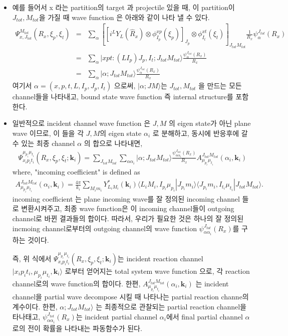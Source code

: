 \documentclass[11pt]{book}
\def\bm{\boldsymbol}
\def\vk{{\bm k}}
\def\la{\langle}
\def\ra{\rangle}
\newcommand{\bea}{\begin{eqnarray}}
\newcommand{\eea}{\end{eqnarray}}
\newcommand{\no}{\nonumber \\}
\begin{document}
\begin{itemize} 
\item 예를 들어서 x 라는 partition의 target 과 projectile 있을 때, 이 partition이 
$J_{tot},M_{tot}$을 가질 때 wave function 은  아래와 같이 
나타 낼 수 있다.
\bea 
\Psi_{x,J_{tot}}^{M_{tot}}(R_x,\xi_p,\xi_t)
&=&\sum_{\alpha} \left[ 
    \left[i^{L} Y_{L}(\hat{R}_x)\otimes \phi^{xp}_{I_p}(\xi_p)\right]_{J_p} 
    \otimes \phi^{xt}_{I_t}(\xi_t)\right]_{J_{tot}M_{tot}}
    \frac{1}{R_x}\psi_{\alpha}^{J_{tot}}(R_x) \no 
&=&\sum_{\alpha} |xpt:(L I_p) J_p,I_t;J_{tot} M_{tot}\ra 
    \frac{\psi_{\alpha}^{J_{tot}}(R_x) }{R_x} \no 
&=&\sum_{\alpha} |\alpha; J_{tot} M_{tot}\ra \frac{\psi_{\alpha}^{J_{tot}}(R_x) }{R_x}
\eea 
여기서 $\alpha=(x,p,t,L,I_p,J_p,I_t)$ 으로써, $|\alpha; J M\ra $는 $J_{tot},M_{tot}$ 을 
만드는 모든 channel들을 나타내고, bound state wave function 즉 internal structure를 포함한다. 

\item 일반적으로 incident channel wave function 은 $J,M$ 의 eigen state가 아닌 
plane wave 이므로, 이 들을 각 $J,M$의 eigen state $\alpha_i$ 로 분해하고, 동시에 
반응후에 갈 수 있는 최종 channel $\alpha$ 의 합으로 나타내면,
\bea 
\Psi_{x_ip_it_i}^{\mu_{p_i}\mu_{t_i}}(R_x,\xi_p,\xi_t; \vk_i)
=\sum_{J_{tot}M_{tot}}\sum_{\alpha \alpha_i}
  |\alpha;J_{tot}M_{tot}\ra 
   \frac{\psi^{J_{tot}}_{\alpha \alpha_i}(R_x)  }{R_x} 
   A^{J_{tot} M_{tot}}_{\mu_{p_i}\mu_{t_i}}(\alpha_i,\vk_i)
\eea  
where, "incoming coefficient" is defined as
\bea 
A^{J_{tot} M_{tot}}_{\mu_{p_i}\mu_{t_i}}(\alpha_i,\vk_i)
=\frac{4\pi}{k_i}\sum_{M_i m_i} Y^*_{L_iM_i}(\vk_i)
  \la L_iM_i,I_{p_i} \mu_{p_i}| J_{p_i} m_i\ra 
  \la J_{p_i} m_i,I_{t_i}\mu_{t_i}|J_{tot} M_{tot}\ra. 
\eea  
incoming coefficient 는 plane incoming wave를 잘 정의된 incoming channel 들로 
변환시켜주고, 최종 wave function은 이 incoming channel들이 outgoing channel로 바뀐
결과들의 합이다. 
따라서, 우리가 필요한 것은 하나의 잘 정의된 incmoing channel로부터의 outgoing channel의 
wave function $\psi^{J_{tot}}_{\alpha \alpha_i}(R_x)$를 구하는 것이다. 

즉, 위 식에서 $\Psi_{x_ip_it_i}^{\mu_{p_i}\mu_{t_i}}(R_x,\xi_p,\xi_t; \vk_i)$는 
incident reaction channel
$|  x_i p_i t_i, \mu_{p_i} \mu_{t_i},\vk_i \ra $ 로부터 얻어지는
total system wave function 으로, 각 reaction channel로의 wave function의 합이다.
한편, $A^{J_{tot} M_{tot}}_{\mu_{p_i}\mu_{t_i}}(\alpha_i,\vk_i)$ 는 
incident channel을 partial wave decompose 시킬 때 나타나는 
partial reaction channe의 계수이다. 
한편, $\alpha;J_{tot}M_{tot}\ra$ 는 최종적으로 관찰되는 partial reaction channel을 
타나태고, $\psi^{J_{tot}}_{\alpha \alpha_i}(R_x)$는 
incident partial channel $\alpha_i$에서 final partial channel $\alpha$ 로의 
전이 확률을 나타내는 파동함수가 된다. 


\end{itemize}
\end{document}
